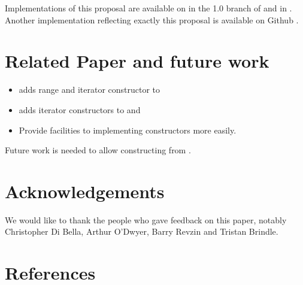 \documentclass{wg21}
\begin{document}
Implementations of this proposal are available on in the 1.0 branch of \cite{Range V3} and in \cite{cmcstl2}.
Another implementation reflecting exactly this proposal is available on Github \cite{rangesnext}.


\section{Related Paper and future work}

\begin{itemize}
	\item {} adds range and iterator constructor to 
    \item \cite{P1425} adds iterator constructors to  and 
    \item \cite{P1419} Provide facilities to implementing  constructors more easily.
\end{itemize}

Future work is needed to allow constructing  from .

\section{Acknowledgements}
We would like to thank the people who gave feedback on this paper, notably Christopher Di Bella, Arthur O'Dwyer, Barry Revzin
and Tristan Brindle.\\

\section{References}
\renewcommand{\section}[2]{}%

\end{document}

